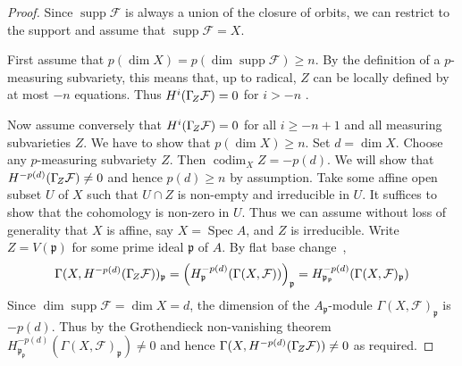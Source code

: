 \documentclass{compositio}
\theoremstyle{plain}
\theoremstyle{definition}
\theoremstyle{remark}
\newcommand\sheaf{\mathcal}
\newcommand\supp{\operatorname{supp}}
\newcommand\codim{\operatorname{codim}}
\DeclareMathOperator\Spec{Spec}
\newcommand\ideal\mathfrak
\newcommand\lc[1]{\Gamma_{\mkern-3mu#1}}
\begin{document}
\begin{proof}
    Since $\supp \sheaf F$ is always a union of the closure of orbits, we can restrict to the support and assume that $\supp \sheaf F = X$.

    First assume that $p(\dim X) = p(\dim \supp \sheaf F) \geq  n$.
    By the definition of a $p$-measuring subvariety, this means that, up to radical, $Z$ can be locally defined by at most $-n$ equations.
    Thus $H^i(\lc Z\sheaf F) = 0$ for $i > -n$ \cite[Theorem~3.3.1]{BrodmannSharp:1998:LocalCohomology}. 

    Now assume conversely that $H^i(\lc Z\sheaf F) = 0$ for all $i \geq  -n+1$ and all measuring subvarieties $Z$.
    We have to show that $p(\dim X) \geq  n$.
    Set $d = \dim X$.
    Choose any $p$-measuring subvariety $Z$.
    Then $\codim_X Z = -p(d)$.
    We will show that $H^{-p(d)}(\lc Z \sheaf F) \ne 0$ and hence $p(d) \ge n$ by assumption.
    Take some affine open subset $U$ of $X$ such that $U \cap Z$ is non-empty and irreducible in $U$.
    It suffices to show that the cohomology is non-zero in $U$.
    Thus we can assume without loss of generality that $X$ is affine, say $X = \Spec A$, and $Z$ is irreducible.
    Write $Z = V(\ideal p)$ for some prime ideal $\ideal p$ of $A$.
    By flat base change~\cite[Theorem~4.3.2]{BrodmannSharp:1998:LocalCohomology},
    \[
    \Gamma (X,H^{-p(d)}(\lc Z \sheaf F))_{\ideal p} = 
    \left(H_{\ideal p}^{-p(d)}(\Gamma (X,\sheaf F))\right)_{\ideal p} =
    H_{\ideal p_{\ideal p}}^{-p(d)}(\Gamma (X,\sheaf F)_{\ideal p})
    \]
    Since $\dim \supp \sheaf F = \dim X = d$, the dimension of the $A_{\ideal p}$-module $\Gamma (X,\sheaf F)_{\ideal p}$ is $-p(d)$.
    Thus by the Grothendieck non-vanishing theorem~\cite[Theorem~6.1.4]{BrodmannSharp:1998:LocalCohomology}
    $H_{\ideal p_{\ideal p}}^{-p(d)}(\Gamma (X,\sheaf F)_{\ideal p}) \ne 0$ and hence $\Gamma (X,H^{-p(d)}(\lc Z \sheaf F)) \ne 0$ as required.
\end{proof}
\end{document}
